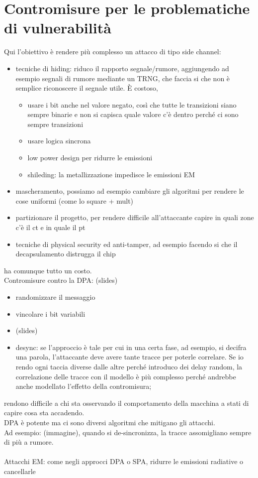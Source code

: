 \documentclass[oneside, 12pt]{extbook}
\begin{document}
\section{Contromisure per le problematiche di vulnerabilità}
Qui l'obiettivo è rendere più complesso un attacco di tipo side channel:
\begin{itemize}
	\item tecniche di hiding: riduco il rapporto segnale/rumore, aggiungendo ad esempio segnali di rumore mediante un TRNG, che faccia si che non è semplice riconoscere il segnale utile. È costoso,
	\begin{itemize}
		\item usare i bit anche nel valore negato, così che tutte le transizioni siano sempre binarie e non si capisca quale valore c'è dentro perché ci sono sempre transizioni
		\item usare logica sincrona
		\item low power design per ridurre le emissioni
		\item shileding: la metallizzazione impedisce le emissioni EM
	\end{itemize}
	\item mascheramento, possiamo ad esempio cambiare gli algoritmi per rendere le cose uniformi (come lo square + mult)
	\item partizionare il progetto, per rendere difficile all'attaccante capire in quali zone c'è il ct e in quale il pt
	\item tecniche di physical security ed anti-tamper, ad esempio facendo si che il decapsulamento distrugga il chip
\end{itemize}
ha comunque tutto un costo.\\
Contromisure contro la DPA: (slides)
\begin{itemize}
	\item randomizzare il messaggio
	\item vincolare i bit variabili
	\item (slides)
	\item desync: se l'approccio è tale per cui in una certa fase, ad esempio, si decifra una parola, l'attaccante deve avere tante tracce per poterle correlare. Se io rendo ogni taccia diverse dalle altre perché introduco dei delay random, la correlazione delle tracce con il modello è più complesso perché andrebbe anche modellato l'effetto della contromisura;
\end{itemize}
rendono difficile a chi sta osservando il comportamento della macchina a stati di capire cosa sta accadendo.\\DPA è potente ma ci sono diversi algoritmi che mitigano gli attacchi.\\Ad esempio: (immagine), quando si de-sincronizza, la tracce assomigliano sempre di più a rumore.\\\\Attacchi EM: come negli approcci DPA o SPA, ridurre le emissioni radiative o cancellarle
\end{document}
